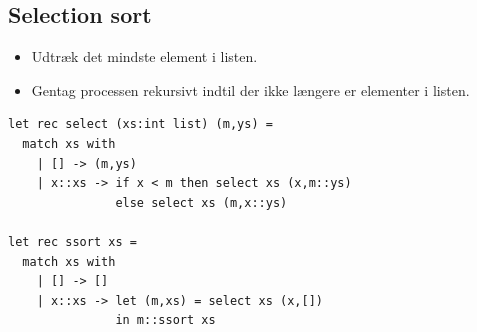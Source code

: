 \documentclass[rgb]{beamer}
\begin{document}
\subsection{Selection sort}
\begin{frame}[fragile]
\begin{footnotesize}


  \begin{itemize}
  \item Udtræk det mindste element i listen.
  \item Gentag processen rekursivt indtil der ikke længere er elementer i listen.
  \end{itemize}


\begin{lstlisting}[numbers=none,frame=none,mathescape]
let rec select (xs:int list) (m,ys) =
  match xs with
    | [] -> (m,ys)
    | x::xs -> if x < m then select xs (x,m::ys)
               else select xs (m,x::ys)

let rec ssort xs =
  match xs with
    | [] -> []
    | x::xs -> let (m,xs) = select xs (x,[])
               in m::ssort xs
\end{lstlisting}

\end{footnotesize}
\end{frame}
\end{document}
